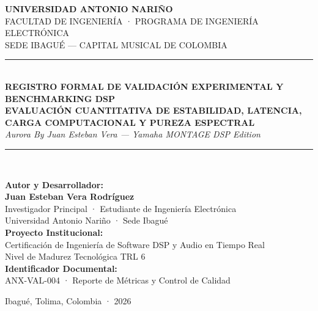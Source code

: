 \documentclass[11pt,a4paper]{article}
\begin{document}
\begin{titlepage}
    \centering
    \vspace*{0.5cm}
    
    {\scshape\LARGE \textbf{UNIVERSIDAD ANTONIO NARIÑO}}\\[0.3cm]
    {\scshape\large FACULTAD DE INGENIERÍA · PROGRAMA DE INGENIERÍA ELECTRÓNICA}\\[0.15cm]
    {\small SEDE IBAGUÉ — CAPITAL MUSICAL DE COLOMBIA}\\[1.5cm]
    
    \rule{\linewidth}{1.8pt}\\[0.4cm]
    {\Huge \bfseries \textcolor{uanblue}{REGISTRO FORMAL DE VALIDACIÓN EXPERIMENTAL Y BENCHMARKING DSP}}\\[0.35cm]
    {\Large \bfseries EVALUACIÓN CUANTITATIVA DE ESTABILIDAD, LATENCIA, CARGA COMPUTACIONAL Y PUREZA ESPECTRAL}\\[0.25cm]
    {\large \itshape Aurora By Juan Esteban Vera — Yamaha MONTAGE DSP Edition}\\[0.4cm]
    \rule{\linewidth}{1.8pt}\\[2.0cm]
    
    \begin{minipage}{0.85\textwidth}
        \large
        \textbf{Autor y Desarrollador:}\\[0.15cm]
        \textbf{Juan Esteban Vera Rodríguez}\\
        Investigador Principal · Estudiante de Ingeniería Electrónica\\
        Universidad Antonio Nariño · Sede Ibagué\\[0.8cm]
        
        \textbf{Proyecto Institucional:}\\
        Certificación de Ingeniería de Software DSP y Audio en Tiempo Real\\
        Nivel de Madurez Tecnológica TRL 6\\[0.8cm]
        
        \textbf{Identificador Documental:}\\
        ANX-VAL-004 · Reporte de Métricas y Control de Calidad
    \end{minipage}
    
    \vfill
    {\large Ibagué, Tolima, Colombia · 2026}
\end{titlepage}
\end{document}
